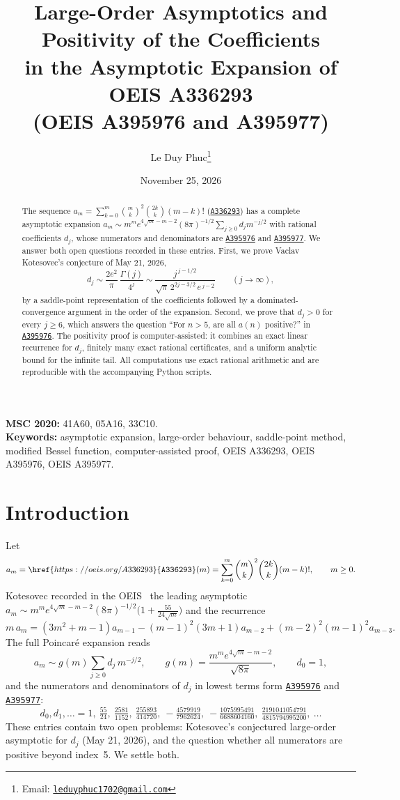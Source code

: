 \documentclass[11pt,a4paper]{article}
\title{Large-Order Asymptotics and Positivity of the Coefficients\\
in the Asymptotic Expansion of OEIS A336293\\
(OEIS A395976 and A395977)}
\author{Le Duy Phuc\thanks{Email: \href{mailto:leduyphuc1702@gmail.com}{\texttt{leduyphuc1702@gmail.com}}}}
\date{November 25, 2026}
\theoremstyle{remark}
\newcommand{\oeis}[1]{\href{https://oeis.org/#1}{\texttt{#1}}}
\begin{document}
\maketitle

\begin{abstract}
The sequence $a_m=\sum_{k=0}^m\binom mk^2\binom{2k}k(m-k)!$ (\oeis{A336293}) has a complete asymptotic expansion
$a_m\sim m^m e^{4\sqrt m-m-2}(8\pi)^{-1/2}\sum_{j\ge0}d_jm^{-j/2}$ with rational coefficients $d_j$, whose numerators and denominators are \oeis{A395976} and \oeis{A395977}. We answer both open questions recorded in these entries. First, we prove Vaclav Kotesovec's conjecture of May 21, 2026,
\[
  d_j\sim\frac{2e^2}{\pi}\,\frac{\Gamma(j)}{4^j}\sim\frac{j^{\,j-1/2}}{\sqrt\pi\,2^{2j-3/2}\,e^{\,j-2}}\qquad(j\to\infty),
\]
by a saddle-point representation of the coefficients followed by a dominated-convergence argument in the order of the expansion. Second, we prove that $d_j>0$ for every $j\ge6$, which answers the question ``For $n>5$, are all $a(n)$ positive?'' in \oeis{A395976}. The positivity proof is computer-assisted: it combines an exact linear recurrence for $d_j$, finitely many exact rational certificates, and a uniform analytic bound for the infinite tail. All computations use exact rational arithmetic and are reproducible with the accompanying Python scripts.
\end{abstract}

\noindent\textbf{MSC 2020:} 41A60, 05A16, 33C10.\\
\textbf{Keywords:} asymptotic expansion, large-order behaviour, saddle-point method, modified Bessel function, computer-assisted proof, OEIS A336293, OEIS A395976, OEIS A395977.

\section{Introduction}

Let
\[
  a_m=\oeis{A336293}(m)=\sum_{k=0}^m\binom mk^2\binom{2k}k(m-k)!,\qquad m\ge0 .
\]
Kotesovec recorded in the OEIS~\cite{OEIS} the leading asymptotic $a_m\sim m^me^{4\sqrt m-m-2}(8\pi)^{-1/2}\bigl(1+\tfrac{55}{24\sqrt m}\bigr)$ and the recurrence
\begin{equation}\label{eq:rec}
  m\,a_m=(3m^2+m-1)a_{m-1}-(m-1)^2(3m+1)a_{m-2}+(m-2)^2(m-1)^2a_{m-3}.
\end{equation}
The full Poincar\'e expansion reads
\begin{equation}\label{eq:expansion}
  a_m\sim g(m)\sum_{j\ge0}d_j\,m^{-j/2},\qquad g(m)=\frac{m^me^{4\sqrt m-m-2}}{\sqrt{8\pi}},\qquad d_0=1,
\end{equation}
and the numerators and denominators of $d_j$ in lowest terms form \oeis{A395976} and \oeis{A395977}:
\[
  d_0,d_1,\dots=1,\ \tfrac{55}{24},\ \tfrac{2581}{1152},\ \tfrac{255893}{414720},\ -\tfrac{4579919}{7962624},\ -\tfrac{1075995491}{6688604160},\ \tfrac{2191041054791}{4815794995200},\ \dots
\]
These entries contain two open problems: Kotesovec's conjectured large-order asymptotic for $d_j$ (May 21, 2026), and the question whether all numerators are positive beyond index~5. We settle both.
\end{document}
